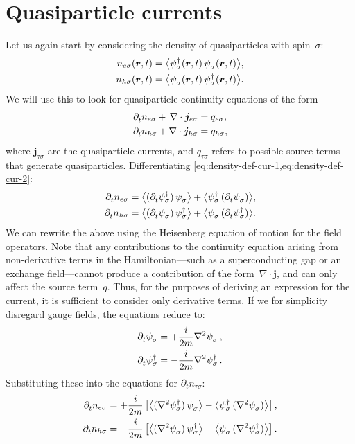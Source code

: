 \section{Quasiparticle currents}
Let us again start by considering the density of quasiparticles with spin~$\sigma$:\
\begin{align}
  \label{eq:density-def-cur-1}
  n_{e\sigma}(\bm r, t) &= \avg[\big]{\hc{\psi_\sigma}(\bm r,t)\, \pc{\psi_\sigma}(\bm r,t)}, \\
  \label{eq:density-def-cur-2}
  n_{h\sigma}(\bm r, t) &= \avg[\big]{\pc{\psi_\sigma}(\bm r,t)\, \hc{\psi_\sigma}(\bm r,t)}.
\end{align}
We will use this to look for quasiparticle continuity equations of the form
\begin{align}
  \partial^{}_{t} n_{e\sigma} +\, \nabla\cdot\bm{j}_{e\sigma} &= q_{e\sigma}, \\
  \partial^{}_{t} n_{h\sigma} +   \nabla\cdot\bm{j}_{h\sigma} &= q_{h\sigma},
\end{align}
where $\bm{j}_{\tau\sigma}$ are the quasiparticle currents, and $q_{\tau\sigma}$ refers to possible source terms that generate quasiparticles.
Differentiating \cref{eq:density-def-cur-1,eq:density-def-cur-2}:
\begin{align}
  \p t n_{e\sigma} &=
  \avg[\big]{(\p t \hc{\psi_{\sigma}})\, \pc{\psi_{\sigma}}} +
  \avg[\big]{\hc{\psi_{\sigma}}\, (\p t \pc{\psi_{\sigma}})} , \\
  \p t n_{h\sigma} &=
  \avg[\big]{(\p t \pc{\psi_{\sigma}})\, \hc{\psi_{\sigma}}} +
  \avg[\big]{\pc{\psi_{\sigma}}\, (\p t \hc{\psi_{\sigma}})} .
\end{align}
We can rewrite the above using the Heisenberg equation of motion for the field operators.
Note that any contributions to the continuity equation arising from non-derivative terms in the Hamiltonian---such as a superconducting gap or an exchange field---cannot produce a contribution of the form~$\nabla\cdot\bm{j}$, and can only affect the source term~$q$.
Thus, for the purposes of deriving an expression for the current, it is sufficient to consider only derivative terms.
If we for simplicity disregard gauge fields, the equations reduce to:
\begin{align}
  \p t \pc{\psi_\sigma} &= +\frac{i}{2m} \nabla^2\pc{\psi_\sigma}\,, \\
  \p t \hc{\psi_\sigma} &= -\frac{i}{2m} \nabla^2\hc{\psi_\sigma}\,.
\end{align}
Substituting these into the equations for $\partial_t n_{\tau\sigma}$:
\begin{align}
  \p t n_{e\sigma} &=
  +\frac{i}{2m} 
  \left[ \avg[\big]{(\nabla^2 \hc{\psi_{\sigma}})\, \pc{\psi_{\sigma}}} -
         \avg[\big]{\hc{\psi_{\sigma}}\, (\nabla^2 \pc{\psi_{\sigma}})} \right], \\
  \p t n_{h\sigma} &=
  -\frac{i}{2m} 
  \left[ \avg[\big]{(\nabla^2 \pc{\psi_{\sigma}})\, \hc{\psi_{\sigma}}} -
         \avg[\big]{\pc{\psi_{\sigma}}\, (\nabla^2 \hc{\psi_{\sigma}})} \right]. \\
\end{align}
